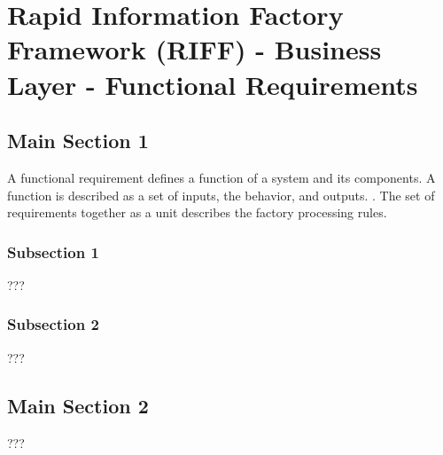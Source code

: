 
\chapter{Rapid Information Factory Framework (RIFF) - Business Layer - Functional Requirements} %

\label{Chapter35} %



\section{Main Section 1}

A functional requirement defines a function of a system and its components. A function is described as a set of inputs, the behavior, and outputs. \cite{roman1985taxonomy}. The set of requirements together as a unit describes the factory processing rules.

\subsection{Subsection 1}

???


\subsection{Subsection 2}

???


\section{Main Section 2}

???
